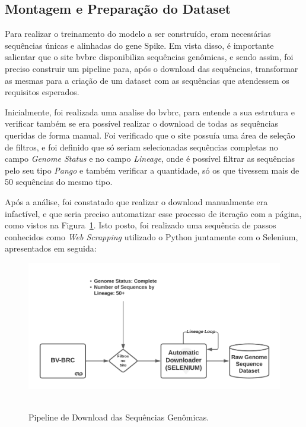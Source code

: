 \subsection{Montagem e Preparação do Dataset}
Para realizar o treinamento do modelo a ser construído, eram necessárias sequências únicas e alinhadas do gene Spike. Em vista disso, é importante salientar que o site \gls{bvbrc} disponibiliza sequências genômicas, e sendo assim, foi preciso construir um pipeline para, após o download das sequências, transformar as mesmas para a criação de um dataset com as sequências que atendessem os requisitos esperados.

Inicialmente, foi realizada uma analise do \gls{bvbrc}, para entende a sua estrutura e verificar também se era possível realizar o download de todas as sequências queridas de forma manual. Foi verificado que o site possuía uma área de seleção de filtros, e foi definido que só seriam selecionadas sequências completas no campo \textit{Genome Status} e no campo \textit{Lineage}, onde é possível filtrar as sequências pelo seu tipo \textit{Pango} e também verificar a quantidade, só os que tivessem mais de 50 sequências do mesmo tipo.

Após a análise, foi constatado que realizar o download manualmente era infactível, e que seria preciso automatizar esse processo de iteração com a página, como vistos na Figura~\ref{fig:pipelineBvbrc}. Isto posto, foi realizado uma sequência de passos conhecidos como \textit{Web Scrapping} utilizado o Python juntamente com o Selenium, apresentados em seguida:

\begin{figure}[htb]
  \centering
  \caption{Pipeline de Download das Sequências Genômicas.}
  \includegraphics[scale=0.6]{figuras/pipelines/bvbrc.png}
  ~\label{fig:pipelineBvbrc}
\end{figure}

